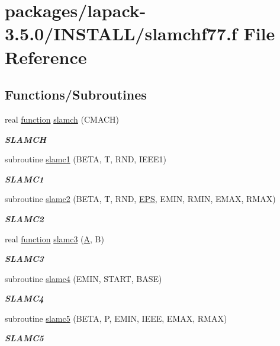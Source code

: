 \hypertarget{slamchf77_8f}{}\section{packages/lapack-\/3.5.0/\+I\+N\+S\+T\+A\+L\+L/slamchf77.f File Reference}
\label{slamchf77_8f}
\subsection*{Functions/\+Subroutines}
\begin{DoxyCompactItemize}
\item 
real \hyperlink{afunc_8m_a7b5e596df91eadea6c537c0825e894a7}{function} \hyperlink{group__auxOTHERauxiliary_ga279f9f1e475af3a6e6101fbfd874f955}{slamch} (C\+M\+A\+C\+H)
\begin{DoxyCompactList}\small\item\em {\bfseries S\+L\+A\+M\+C\+H} \end{DoxyCompactList}\item 
subroutine \hyperlink{group__auxOTHERauxiliary_ga0259f906df485fc6fba360cb3ebef320}{slamc1} (B\+E\+T\+A, T, R\+N\+D, I\+E\+E\+E1)
\begin{DoxyCompactList}\small\item\em {\bfseries S\+L\+A\+M\+C1} \end{DoxyCompactList}\item 
subroutine \hyperlink{group__auxOTHERauxiliary_ga72e67de62733142ac7f456696018d1ef}{slamc2} (B\+E\+T\+A, T, R\+N\+D, \hyperlink{tukey_8c_a6ebf6899d6c1c8b7b9d09be872c05aae}{E\+P\+S}, E\+M\+I\+N, R\+M\+I\+N, E\+M\+A\+X, R\+M\+A\+X)
\begin{DoxyCompactList}\small\item\em {\bfseries S\+L\+A\+M\+C2} \end{DoxyCompactList}\item 
real \hyperlink{afunc_8m_a7b5e596df91eadea6c537c0825e894a7}{function} \hyperlink{slamchf77_8f_a063f886475dbe005f58b9c37ced98b65}{slamc3} (\hyperlink{classA}{A}, B)
\begin{DoxyCompactList}\small\item\em {\bfseries S\+L\+A\+M\+C3} \end{DoxyCompactList}\item 
subroutine \hyperlink{slamchf77_8f_a94c08689c8608b5ec74a6986fc752b64}{slamc4} (E\+M\+I\+N, S\+T\+A\+R\+T, B\+A\+S\+E)
\begin{DoxyCompactList}\small\item\em {\bfseries S\+L\+A\+M\+C4} \end{DoxyCompactList}\item 
subroutine \hyperlink{slamchf77_8f_a1b6914b771d6c2276fc60475c1d6e70b}{slamc5} (B\+E\+T\+A, P, E\+M\+I\+N, I\+E\+E\+E, E\+M\+A\+X, R\+M\+A\+X)
\begin{DoxyCompactList}\small\item\em {\bfseries S\+L\+A\+M\+C5} \end{DoxyCompactList}\end{DoxyCompactItemize}



